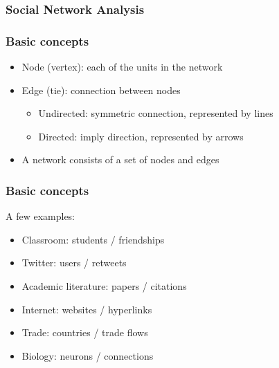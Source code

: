 \documentclass{beamer}
\begin{document}
	

  

\begin{frame}
	\frametitle{Social Network Analysis}


\end{frame}




\begin{frame}
	\frametitle{Basic concepts}
	\begin{itemize}[<+->]
		\item \alert{Node} (vertex): each of the units in the network
		\item \alert{Edge} (tie): connection between nodes
		\begin{itemize}
			\item Undirected: symmetric connection, represented by lines
			\item Directed: imply direction, represented by arrows
		\end{itemize}
		\item A \alert{network} consists of a set of nodes and edges
	\end{itemize}
\end{frame}

\begin{frame}
	\frametitle{Basic concepts}
	A few examples:
	\begin{itemize}[<+->]
		\item Classroom: students / friendships
		\item Twitter: users / retweets
		\item Academic literature: papers / citations
		\item Internet: websites / hyperlinks
		\item Trade: countries / trade flows
		\item Biology: neurons / connections
	\end{itemize}
	
\end{frame}
\end{document}
